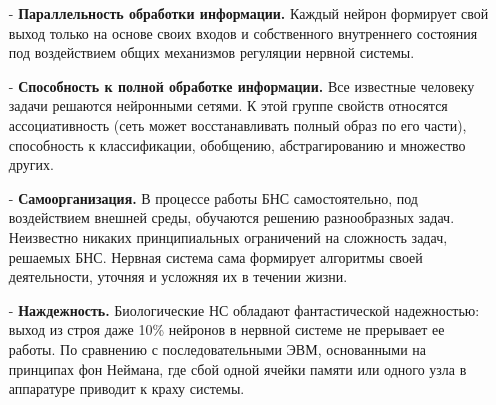 \begin{itemize}
\item[-] {\bf Параллельность обработки информации. }
Каждый нейрон формирует свой выход только на основе своих входов и собственного внутреннего состояния под воздействием общих механизмов регуляции нервной системы.
\item[-] {\bf Способность к полной обработке информации. }
Все известные человеку задачи решаются нейронными сетями.
К этой группе свойств относятся ассоциативность (сеть может восстанавливать полный образ по его части), способность к классификации, обобщению, абстрагированию и множество других.
\item[-] {\bf Самоорганизация.}
В процессе работы БНС самостоятельно, под воздействием внешней среды, обучаются решению разнообразных задач.
Неизвестно никаких принципиальных ограничений на сложность задач, решаемых БНС.
Нервная система сама формирует алгоритмы своей деятельности, уточняя и усложняя их в течении жизни.
\item[-] {\bf Наждежность. }
Биологические НС обладают фантастической надежностью: выход из строя даже 10\% нейронов в нервной системе не прерывает ее работы. 
По сравнению с последовательными ЭВМ, основанными на принципах фон Неймана, где сбой одной ячейки памяти или одного узла в аппаратуре приводит к краху системы.\cite{COURSE}
\end{itemize}